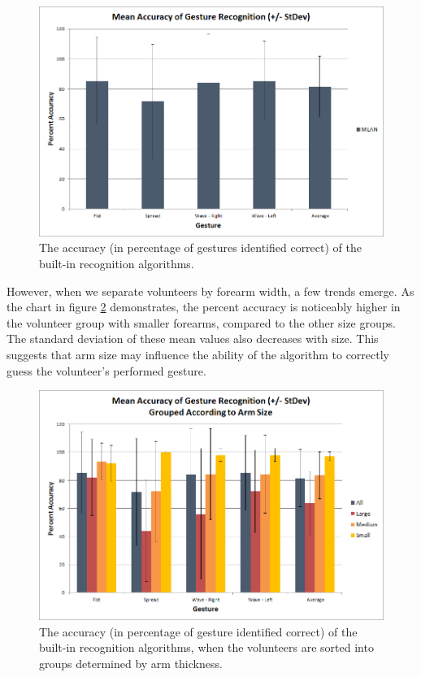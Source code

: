 \documentclass[journal]{IEEEtran}
\begin{document}
    \begin{figure}[H]
    \begin{centering}
    \includegraphics[width=.4\textwidth]{EMG/Accuracy_Ungrouped}
    \caption{The accuracy (in percentage of gestures identified correct) of the built-in recognition algorithms.}
    \label{accungroup}
    \end{centering}
    \end{figure}
    
However, when we separate volunteers by forearm width, a few trends emerge. As the chart in figure \ref{accgroup} demonstrates, the percent accuracy is noticeably higher in the volunteer group with smaller forearms, compared to the other size groups. The standard deviation of these mean values also decreases with size. This suggests that arm size may influence the ability of the algorithm to correctly guess the volunteer's performed gesture.

    \begin{figure}[H]
    \begin{centering}
    \includegraphics[width=.\textwidth]{EMG/Accuracy_Grouped}
    \caption{The accuracy (in percentage of gesture identified correct) of the built-in recognition algorithms, when the volunteers are sorted into groups determined by arm thickness.}
    \label{accgroup}
    \end{centering}
    \end{figure}
    
\end{document}
